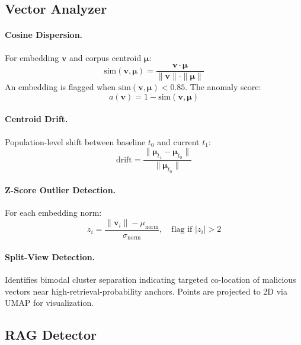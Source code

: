\documentclass[11pt,twocolumn]{article}
\begin{document}
\subsection{Vector Analyzer}

\paragraph{Cosine Dispersion.} For embedding $\mathbf{v}$ and corpus centroid $\boldsymbol{\mu}$:
\begin{equation}
\text{sim}(\mathbf{v}, \boldsymbol{\mu}) = \frac{\mathbf{v} \cdot \boldsymbol{\mu}}{\|\mathbf{v}\| \cdot \|\boldsymbol{\mu}\|}
\label{eq:cosine}
\end{equation}
An embedding is flagged when $\text{sim}(\mathbf{v}, \boldsymbol{\mu}) < 0.85$. The anomaly score:
\begin{equation}
a(\mathbf{v}) = 1 - \text{sim}(\mathbf{v}, \boldsymbol{\mu})
\label{eq:anomaly}
\end{equation}

\paragraph{Centroid Drift.} Population-level shift between baseline $t_0$ and current $t_1$:
\begin{equation}
\text{drift} = \frac{\|\boldsymbol{\mu}_{t_1} - \boldsymbol{\mu}_{t_0}\|}{\|\boldsymbol{\mu}_{t_0}\|}
\label{eq:drift}
\end{equation}

\paragraph{Z-Score Outlier Detection.} For each embedding norm:
\begin{equation}
z_i = \frac{\|\mathbf{v}_i\| - \mu_{\text{norm}}}{\sigma_{\text{norm}}}, \quad \text{flag if } |z_i| > 2
\label{eq:zscore}
\end{equation}

\paragraph{Split-View Detection.} Identifies bimodal cluster separation indicating targeted co-location of malicious vectors near high-retrieval-probability anchors. Points are projected to 2D via UMAP for visualization.

\subsection{RAG Detector}
\end{document}
